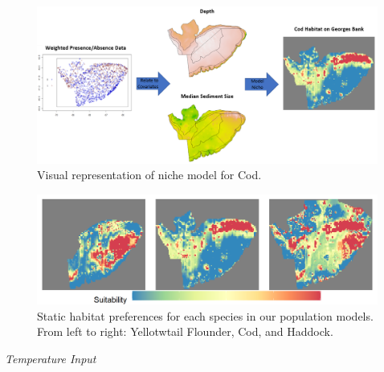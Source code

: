 \documentclass[
  12pt,
]{article}
\begin{document}
\begin{figure}

{\centering \includegraphics[width=0.95\linewidth]{Images/hab_snip3} 

}

\caption{Visual representation of niche model for Cod.}\label{fig:hab-plot1}
\end{figure}

\begin{figure}

{\centering \includegraphics[width=0.95\linewidth]{Images/Habitat_3species} 

}

\caption{Static habitat preferences for each species in our population models. From left to right: Yellotwtail Flounder, Cod, and Haddock.}\label{fig:hab-plot}
\end{figure}

\emph{Temperature Input}
\end{document}

